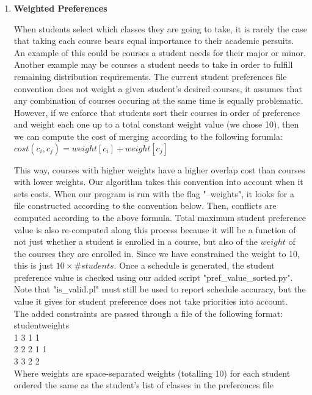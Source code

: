 \documentclass[11pt, oneside]{article}   	%
\begin{document}
\begin{enumerate}
\item{\textbf{Weighted Preferences}}

When students select which classes they are going to take, it is rarely the case that taking each course bears equal importance to their academic persuits. An example of this could be courses a student needs for their major or minor. Another example may be courses a student needs to take in order to fulfill remaining distribution requirements. The current student preferences file convention does not weight a given student's desired courses, it assumes that any combination of courses occuring at the same time is equally problematic. However, if we enforce that students sort their courses in order of preference and weight each one up to a total constant weight value (we chose 10), then we can compute the cost of merging according to the following forumla:\\

$cost(c_i,c_j) = weight[c_i] + weight[c_j]$

This way, courses with higher weights have a higher overlap cost than courses with lower weights. Our algorithm takes this convention into account when it sets costs. When our program is run with the flag "--weights", it looks for a file constructed according to the convention below. Then, conflicts are computed according to the above formula. Total maximum student preference value is also re-computed along this process because it will be a function of not just whether a student is enrolled in a course, but also of the $weight$ of the courses they are enrolled in. Since we have constrained the weight to 10, this is just $10\times \#students$. Once a schedule is generated, the student preference value is checked using our added script "pref\_value\_sorted.py". Note that "is\_valid.pl" must still be used to report schedule accuracy, but the value it gives for student preference does not take priorities into account.\\

The added constraints are passed through a file of the following format:\\

student\qquad weights \\
1 3 1 1 \\
2 2 2 1 1 \\
3 3 2 2  \\

Where weights are space-separated weights (totalling 10) for each student ordered the same as the student's list of classes in the preferences file


\end{enumerate}
\end{document}
